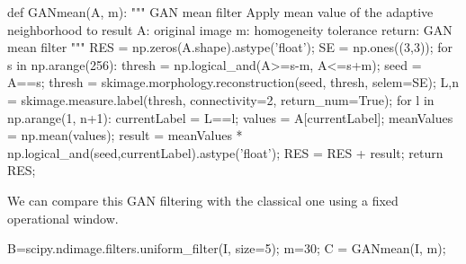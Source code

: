 \vspace*{-0.9\baselineskip}

\begin{python}
def GANmean(A, m):
    """
    GAN mean filter
    Apply mean value of the adaptive neighborhood to result
    A: original image
    m: homogeneity tolerance
    return: GAN mean filter
    """
    RES = np.zeros(A.shape).astype('float');   
    SE = np.ones((3,3));
    for s in np.arange(256):
        thresh = np.logical_and(A>=s-m, A<=s+m);
        seed = A==s;
        thresh = skimage.morphology.reconstruction(seed, thresh, selem=SE);
        L,n = skimage.measure.label(thresh, connectivity=2, return_num=True);
        for l in np.arange(1, n+1):
            currentLabel = L==l;
            values = A[currentLabel];
            meanValues = np.mean(values);
            result = meanValues * np.logical_and(seed,currentLabel).astype('float');
            RES = RES + result;
    return RES;
\end{python}

\noindent{}


We can compare this GAN filtering with the classical one using a fixed operational window.

\begin{python}
B=scipy.ndimage.filters.uniform_filter(I, size=5);
m=30;
C = GANmean(I, m);
\end{python}

